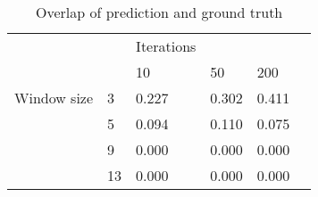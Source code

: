 \documentclass{article}
\begin{document}
\begin{table}[b]
  \caption{Overlap of prediction and ground truth}
  \label{overlap}
  \centering
  \begin{tabular}{llllll}
    \toprule
			    & &Iterations &&\\
                &    & 10    & 50    & 200 \\
    \midrule
    Window size & 3  & 0.227 & 0.302 & 0.411 \\
                & 5  & 0.094 & 0.110 & 0.075 \\
                & 9  & 0.000 & 0.000 & 0.000 \\
                & 13 & 0.000 & 0.000 & 0.000 \\
     \bottomrule
  \end{tabular}
\end{table}
\end{document}
